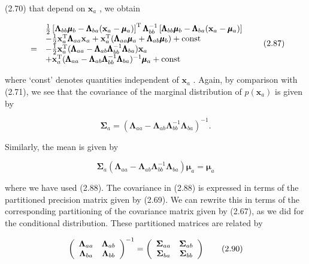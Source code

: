 \documentclass[
  10
]{article}
\begin{document}
(2.70) that depend on \(\mathbf { x } _ { a }\) , we obtain

\[
\begin{array}{r l} & {\frac {1}{2} \left[ \boldsymbol {\Lambda} _ {b b} \pmb {\mu} _ {b} - \pmb {\Lambda} _ {b a} (\mathbf {x} _ {a} - \pmb {\mu} _ {a}) \right] ^ {\mathrm{T}} \pmb {\Lambda} _ {b b} ^ {- 1} \left[ \pmb {\Lambda} _ {b b} \pmb {\mu} _ {b} - \pmb {\Lambda} _ {b a} (\mathbf {x} _ {a} - \pmb {\mu} _ {a}) \right]} \\ & {- \frac {1}{2} \mathbf {x} _ {a} ^ {\mathrm{T}} \pmb {\Lambda} _ {a a} \mathbf {x} _ {a} + \mathbf {x} _ {a} ^ {\mathrm{T}} (\pmb {\Lambda} _ {a a} \pmb {\mu} _ {a} + \pmb {\Lambda} _ {a b} \pmb {\mu} _ {b}) + \mathrm{const}} \\ {=} & {- \frac {1}{2} \mathbf {x} _ {a} ^ {\mathrm{T}} (\pmb {\Lambda} _ {a a} - \pmb {\Lambda} _ {a b} \pmb {\Lambda} _ {b b} ^ {- 1} \pmb {\Lambda} _ {b a}) \mathbf {x} _ {a}} \\ & {+ \mathbf {x} _ {a} ^ {\mathrm{T}} (\pmb {\Lambda} _ {a a} - \pmb {\Lambda} _ {a b} \pmb {\Lambda} _ {b b} ^ {- 1} \pmb {\Lambda} _ {b a}) ^ {- 1} \pmb {\mu} _ {a} + \mathrm{const}} \end{array}\tag{2.87}
\]

where `const' denotes quantities independent of
\(\mathbf { x } _ { a }\) . Again, by comparison with (2.71), we see
that the covariance of the marginal distribution of
\(p ( \mathbf { x } _ { a } )\) is given by

\[
\pmb {\Sigma} _ {a} = \left(\pmb {\Lambda} _ {a a} - \pmb {\Lambda} _ {a b} \pmb {\Lambda} _ {b b} ^ {- 1} \pmb {\Lambda} _ {b a}\right) ^ {- 1}.\tag{2.88}
\]

Similarly, the mean is given by

\[
\pmb {\Sigma} _ {a} (\pmb {\Lambda} _ {a a} - \pmb {\Lambda} _ {a b} \pmb {\Lambda} _ {b b} ^ {- 1} \pmb {\Lambda} _ {b a}) \pmb {\mu} _ {a} = \pmb {\mu} _ {a}\tag{2.89}
\]

where we have used (2.88). The covariance in (2.88) is expressed in
terms of the partitioned precision matrix given by (2.69). We can
rewrite this in terms of the corresponding partitioning of the
covariance matrix given by (2.67), as we did for the conditional
distribution. These partitioned matrices are related by

\[
\left( \begin{array}{c c} \boldsymbol {\Lambda} _ {a a} & \boldsymbol {\Lambda} _ {a b} \\ \boldsymbol {\Lambda} _ {b a} & \boldsymbol {\Lambda} _ {b b} \end{array} \right) ^ {- 1} = \left( \begin{array}{c c} \boldsymbol {\Sigma} _ {a a} & \boldsymbol {\Sigma} _ {a b} \\ \boldsymbol {\Sigma} _ {b a} & \boldsymbol {\Sigma} _ {b b} \end{array} \right)\tag{2.90}
\]
\end{document}
